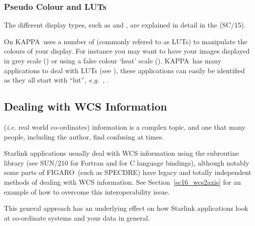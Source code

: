 \documentclass[twoside,11pt]{starlink}
\providecommand{\FIGARO}{{\footnotesize FIGARO}\normalsize}
\providecommand{\KAPPA}{{\footnotesize KAPPA}\normalsize}
\providecommand{\SPECDRE}{{\footnotesize SPECDRE}\normalsize}
\begin{document}
\subsubsection{Pseudo Colour and LUTs}

The different display types, such as  and ,
are explained in detail in the  (SC/15).

On  \KAPPA\ uses a
number of  (commonly
refered to as LUTs) to manipulate the colours of your display.  For
instance you may want to have your images displayed in grey scale
() or using a false colour `heat'
scale ().  \KAPPA\ has many applications to
deal with LUTs (see ), these applications can
easily be identified as they all start with ``lut'', \emph{e.g.}\
, .

\subsection{Dealing with WCS Information\label{sc16_wcs}}

 (\emph{i.e.} real
world co-ordinates) information is a complex topic, and one that many people,
including the author, find confusing at times.

Starlink applications usually deal with WCS information using the
\xref{\footnotesize{AST}\normalsize}{sun210}{} subroutine library (see
SUN/210 for Fortran and \xref{SUN/211}{sun211}{} for C language
bindings), although notably some parts of \FIGARO\ (such as \SPECDRE)
have legacy and totally independent methods of dealing with WCS
information.
See Section~\ref{sc16_wcs2axis} for an example
of how to overcome this interoperability issue.

This general approach has an underlying effect on how
Starlink applications look at co-ordinate systems and your data in
general.
\end{document}
